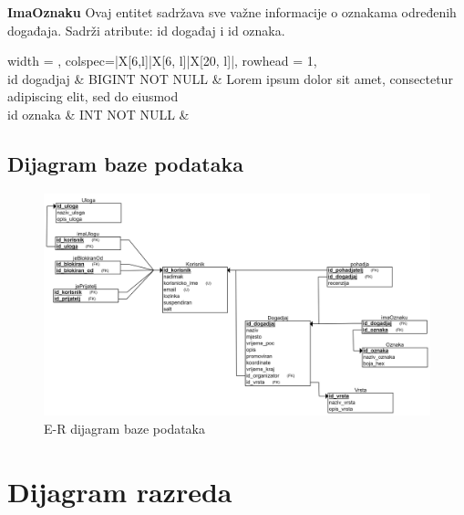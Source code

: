 				
				\noindent\textbf{ImaOznaku} Ovaj entitet sadržava sve važne informacije o oznakama određenih događaja. Sadrži atribute: id događaj i id oznaka.
				
				\begin{longtblr}[
					label=none,
					entry=none
					]{
						width = \textwidth,
						colspec={|X[6,l]|X[6, l]|X[20, l]|}, 
						rowhead = 1,
					} %
					\hline {}	 \\ \hline[3pt]
					id dogadjaj & BIGINT NOT NULL	&  	Lorem ipsum dolor sit amet, consectetur adipiscing elit, sed do eiusmod  	\\ \hline
					id oznaka	& INT NOT NULL &   	\\ \hline 
				
				\end{longtblr}
			
				
			
			
				
				
			
			\subsection{Dijagram baze podataka}
				
				
			\begin{figure}[h]
				\includegraphics[width=\textwidth]{dijagrami/Baza podataka/REL shema.png}
				\caption{E-R dijagram baze podataka}
			\end{figure}
				
			\eject
			
			
		\section{Dijagram razreda}
		
